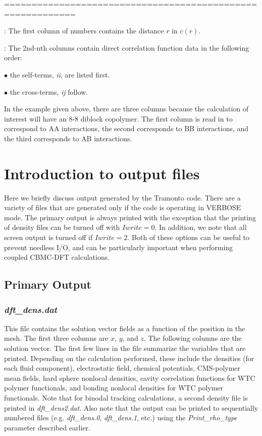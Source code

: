 \documentclass[10pt,onecolumn]{article}
\begin{document}
\noindent===========================================================
\vspace{0.1in}


\vspace{0.1in}
: The first column of numbers contains the distance $r$
in $c(r)$.  

\vspace{0.1in}
: The 2nd-nth columns contain direct
correlation function data in the following order:

\noindent$\bullet$ the self-terms, {\it ii}, are listed first.

\noindent$\bullet$ the cross-terms, {\it ij} follow.

\vspace{0.1in}
\noindent{} In the example given above, there are three columns because
the calculation of interest will have an 8-8 diblock copolymer.  The
first column is read in to correspond to AA interactions, the second
corresponds to BB interactions, and the third corresponds to AB interactions.

\vfill
\break

\section{Introduction to output files}
Here we briefly discuss output generated by the Tramonto code.  There are a variety of files that are generated only if the code is operating in VERBOSE mode.  The primary output is always printed with the exception that the printing of density files can be turned off with $Iwrite=0$.  In addition, we note that all screen output is turned off if $Iwrite=2$.  Both of these options can be useful to prevent needless I/O, and can be particularly important when performing coupled CBMC-DFT calculations.

\subsection{Primary Output}
\subsubsection{{\it dft\_dens.dat}}
This file contains the solution vector fields as a function of the position in the mesh.
The first three columns are $x$, $y$, and $z$.  The following columns are the 
solution vector.  The first few lines in the file summarize the variables that are printed.  Depending on the calculation performed, these include the densities (for each fluid component), electrostatic field, chemical potentials, CMS-polymer mean fields, hard sphere nonlocal densities, cavity correlation functions for WTC polymer functionals, and bonding nonlocal densities for WTC polymer functionals.   Note that for binodal tracking calculations, a second density file is printed in {\it dft\_dens2.dat}.  Also note that the output can be printed to sequentially numbered files (e.g. {\it dft\_dens.0}, {\it dft\_dens.1}, etc.) using the {\it Print\_rho\_type} parameter described earlier.  
\end{document}
